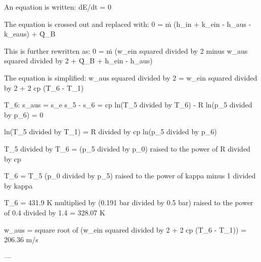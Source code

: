 An equation is written:  
dE/dt = 0  

The equation is crossed out and replaced with:  
0 = ṁ (h_in + k_ein - h_aus - k_eaus) + Q̇_B  

This is further rewritten as:  
0 = ṁ (w_ein squared divided by 2 minus w_aus squared divided by 2 + Q̇_B + h_ein - h_aus)  

The equation is simplified:  
w_aus squared divided by 2 = w_ein squared divided by 2 + 2 cp (T_6 - T_1)  

T_6:  
s_aus = s_e  
s_5 - s_6 = cp ln(T_5 divided by T_6) - R ln(p_5 divided by p_6) = 0  

ln(T_5 divided by T_1) = R divided by cp ln(p_5 divided by p_6)  

T_5 divided by T_6 = (p_5 divided by p_0) raised to the power of R divided by cp  

T_6 = T_5 (p_0 divided by p_5) raised to the power of kappa minus 1 divided by kappa  

T_6 = 431.9 K multiplied by (0.191 bar divided by 0.5 bar) raised to the power of 0.4 divided by 1.4 = 328.07 K  

w_aus = square root of (w_ein squared divided by 2 + 2 cp (T_6 - T_1)) = 206.36 m/s  

---